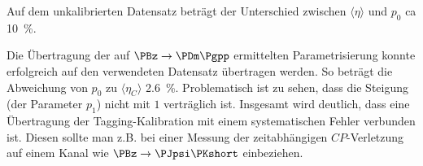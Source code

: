 Auf dem unkalibrierten Datensatz beträgt der Unterschied zwischen $\langle η \rangle$ und $p_0$ ca \SI{10}{\percent}.

Die Übertragung der auf $\PBz \to \PDm\Pgpp$ ermittelten Parametrisierung konnte erfolgreich auf den verwendeten Datensatz übertragen werden.
So beträgt die Abweichung von $p_0$ zu $\langle η_C \rangle$ \SI{2.6}{\percent}.
Problematisch ist zu sehen, dass die Steigung (der Parameter $p_1$) nicht mit $1$ verträglich ist.
Insgesamt wird deutlich, dass eine Übertragung der Tagging-Kalibration mit einem systematischen Fehler verbunden ist.
Diesen sollte man z.B. bei einer Messung der zeitabhängigen $CP$-Verletzung auf einem Kanal wie $\PBz \to \PJpsi\PKshort$ einbeziehen.

